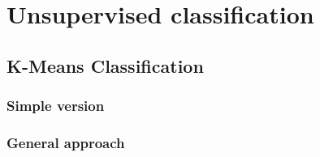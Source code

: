


\section{Unsupervised classification}

\subsection{K-Means Classification}
\label{sec:KMeansClassifier}

\subsubsection{Simple version}
\ifitkFullVersion

\fi
\ifitkFullVersion

\fi

\subsubsection{General approach}
\ifitkFullVersion

\fi

